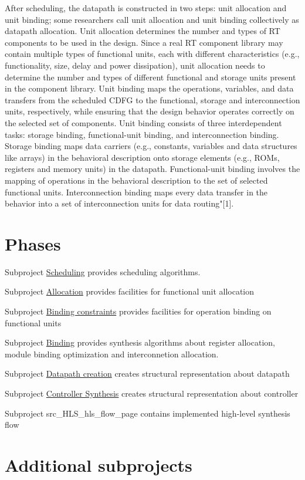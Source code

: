 After scheduling, the datapath is constructed in two steps\+: unit allocation and unit binding; some researchers call unit allocation and unit binding collectively as datapath allocation. Unit allocation determines the number and types of RT components to be used in the design. Since a real RT component library may contain multiple types of functional units, each with different characteristics (e.\+g., functionality, size, delay and power dissipation), unit allocation needs to determine the number and types of different functional and storage units present in the component library. Unit binding maps the operations, variables, and data transfers from the scheduled C\+D\+FG to the functional, storage and interconnection units, respectively, while ensuring that the design behavior operates correctly on the selected set of components. Unit binding consists of three interdependent tasks\+: storage binding, functional-\/unit binding, and interconnection binding. Storage binding maps data carriers (e.\+g., constants, variables and data structures like arrays) in the behavioral description onto storage elements (e.\+g., R\+O\+Ms, registers and memory units) in the datapath. Functional-\/unit binding involves the mapping of operations in the behavioral description to the set of selected functional units. Interconnection binding maps every data transfer in the behavior into a set of interconnection units for data routing"\mbox{[}1\mbox{]}.\hypertarget{src_HLS_page_src_HLS_phases}{}\section{Phases}\label{src_HLS_page_src_HLS_phases}

\begin{DoxyItemize}
\item Subproject \hyperlink{src_HLS_scheduling_general}{Scheduling} provides scheduling algorithms.
\item Subproject \hyperlink{src_HLS_allocation_page}{Allocation} provides facilities for functional unit allocation
\item Subproject \hyperlink{src_HLS_binding_constraints_page}{Binding constraints} provides facilities for operation binding on functional units
\item Subproject \hyperlink{src_HLS_binding_page}{Binding} provides synthesis algorithms about register allocation, module binding optimization and interconnetion allocation.
\item Subproject \hyperlink{src_HLS_datapath_page}{Datapath creation} creates structural representation about datapath
\item Subproject \hyperlink{src_HLS_controller_fsm}{Controller Synthesis} creates structural representation about controller
\item Subproject src\+\_\+\+H\+L\+S\+\_\+hls\+\_\+flow\+\_\+page contains implemented high-\/level synthesis flow
\end{DoxyItemize}\hypertarget{src_HLS_page_src_HLS_additional}{}\section{Additional subprojects}\label{src_HLS_page_src_HLS_additional}


